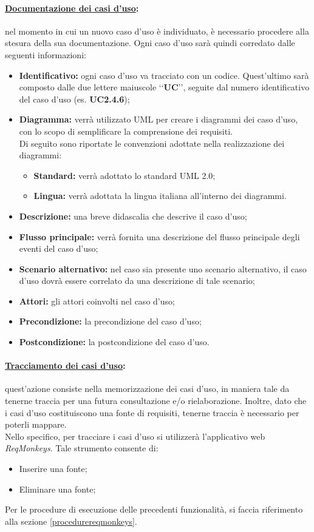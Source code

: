 \paragraph{\underline{Documentazione dei casi d'uso}:} nel momento in cui un nuovo caso d'uso è individuato, è necessario procedere alla stesura della sua documentazione. Ogni caso d'uso sarà quindi corredato dalle seguenti informazioni:
\begin{itemize}
\item\textbf{Identificativo:} ogni caso d'uso\glossario{} va tracciato con un codice. Quest'ultimo sarà composto dalle due lettere maiuscole \lq\lq{}\textbf{UC}\rq\rq{}, seguite dal numero identificativo del caso d'uso\glossario{} (es. \textbf{UC2.4.6});
\item\textbf{Diagramma:} verrà utilizzato UML\g{} per creare i diagrammi dei caso d'uso\g{}, con lo scopo di semplificare la comprensione dei requisiti.
\\Di seguito sono riportate le convenzioni adottate nella realizzazione dei diagrammi:
\begin{itemize}
\item\textbf{Standard:} verrà adottato lo standard UML\glossario{} 2.0;
\item\textbf{Lingua:} verrà adottata la lingua italiana all'interno dei diagrammi. 
\end{itemize}
\item\textbf{Descrizione:} una breve didascalia che descrive il caso d'uso\glossario{};
\item\textbf{Flusso principale:} verrà fornita una descrizione del flusso principale degli eventi del caso d'uso\glossario{};
\item\textbf{Scenario alternativo:} nel caso sia presente uno scenario alternativo, il caso d'uso\glossario{} dovrà essere correlato da una descrizione di tale scenario;
\item\textbf{Attori:} gli attori coinvolti nel caso d'uso\glossario{};
\item\textbf{Precondizione:} la precondizione del caso d'uso;
\item\textbf{Postcondizione:} la postcondizione del caso d'uso.
\end{itemize}

\paragraph{\underline{Tracciamento dei casi d'uso}:} quest'azione consiste nella memorizzazione dei casi d'uso, in maniera tale da tenerne traccia per una futura consultazione e/o rielaborazione. Inoltre, dato che i casi d'uso costituiscono una fonte di requisiti, tenerne traccia è necessario per poterli mappare.\\
Nello specifico, per tracciare i casi d'uso si utilizzerà l'applicativo web \textit{ReqMonkeys}. Tale strumento consente di:
\begin{itemize}
\item Inserire una fonte;
\item Eliminare una fonte;
\end{itemize}
Per le procedure di esecuzione delle precedenti funzionalità, si faccia riferimento alla sezione \ref{procedurereqmonkeys}.

